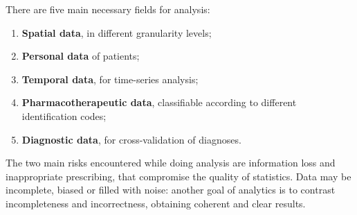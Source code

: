 There are five main necessary fields for analysis\cite{DC}:
\begin{enumerate}
	\item \textbf{Spatial data}, in different granularity levels;
	\item \textbf{Personal data} of patients;
	\item \textbf{Temporal data}, for time-series analysis;
	\item \textbf{Pharmacotherapeutic data}, classifiable according to different identification codes;
	\item \textbf{Diagnostic data}, for cross-validation of diagnoses.
\end{enumerate}

The two main risks encountered while doing analysis are information loss and inappropriate prescribing, that compromise the quality of statistics. Data may be incomplete, biased or filled with noise: another goal of analytics is to contrast incompleteness and incorrectness, obtaining coherent and clear results.
